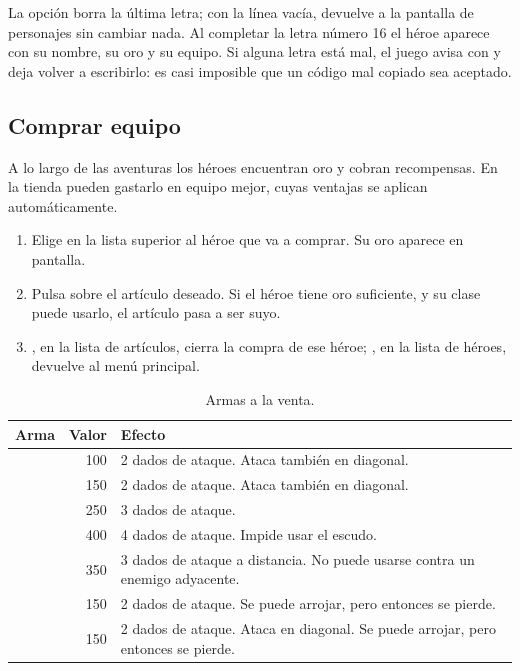 La opción  borra la última letra; con la línea vacía, devuelve a
la pantalla de personajes sin cambiar nada. Al completar la letra número 16
el héroe aparece con su nombre, su oro y su equipo. Si alguna letra está
mal, el juego avisa con  y deja volver a
escribirlo: es casi imposible que un código mal copiado sea aceptado.


\subsection{Comprar equipo}


A lo largo de las aventuras los héroes encuentran oro y cobran recompensas.
En la tienda pueden gastarlo en equipo mejor, cuyas ventajas se aplican
automáticamente.

\begin{enumerate}
\item Elige en la lista superior al héroe que va a comprar. Su oro aparece
  en pantalla.
\item Pulsa sobre el artículo deseado. Si el héroe tiene oro suficiente, y
  su clase puede usarlo, el artículo pasa a ser suyo.
\item {}, en la lista de artículos, cierra la compra de ese héroe;
  , en la lista de héroes, devuelve al menú principal.
\end{enumerate}

\begin{table}[H]\centering\small
\begin{tabularx}{\linewidth}{@{}lrL@{}}
\toprule
\textbf{Arma} & \textbf{Valor} & \textbf{Efecto}\\
\midrule
{}     & 100 & 2 dados de ataque. Ataca también en diagonal.\\
       & 150 & 2 dados de ataque. Ataca también en diagonal.\\
     & 250 & 3 dados de ataque.\\
 & 400 & 4 dados de ataque. Impide usar el escudo.\\
   & 350 & 3 dados de ataque a distancia. No puede usarse
                          contra un enemigo adyacente.\\
      & 150 & 2 dados de ataque. Se puede arrojar, pero
                          entonces se pierde.\\
      & 150 & 2 dados de ataque. Ataca en diagonal. Se puede
                          arrojar, pero entonces se pierde.\\
\bottomrule
\end{tabularx}
\caption{Armas a la venta.}
\end{table}

